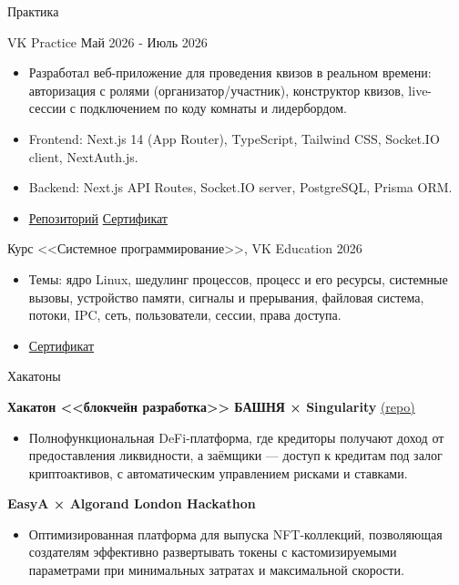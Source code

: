 \documentclass{style} %
\begin{document}
\begin{rSection}{Практика}

   
    VK Practice \hfill \hfill Май 2026 - Июль 2026\
    \begin{itemize}
        \itemsep -3pt {}
        \item Разработал веб-приложение для проведения квизов в реальном времени: авторизация с ролями (организатор/участник), конструктор квизов, live-сессии с подключением по коду комнаты и лидербордом.
        \item Frontend: Next.js 14 (App Router), TypeScript, Tailwind CSS, Socket.IO client, NextAuth.js.
        \item Backend: Next.js API Routes, Socket.IO server, PostgreSQL, Prisma ORM.
        \item \href{https://github.com/MaximovIlya/vk_practice_project}{Репозиторий} \quad \href{https://drive.google.com/file/d/1UOm4LQo9R1axcW96MlJNprpl17DQTAPg/view?usp=sharing}{Сертификат}
    \end{itemize}

    Курс <<Системное программирование>>, VK Education \hfill 2026\\
    \begin{itemize}
        \itemsep -3pt {}
        \item Темы: ядро Linux, шедулинг процессов, процесс и его ресурсы, системные вызовы, устройство памяти, сигналы и прерывания, файловая система, потоки, IPC, сеть, пользователи, сессии, права доступа.
        \item \href{СЕРТИФИКАТ_ССЫЛКА}{Сертификат}
    \end{itemize}

\end{rSection}

\begin{rSection}{Хакатоны}
\vspace{-1.25em}
\item \textbf{Хакатон <<блокчейн разработка>> БАШНЯ × Singularity} {\href{https://github.com/MaximovIlya/singularity}{(repo)}}
\begin{itemize}
    \itemsep -3pt {}
     \item Полнофункциональная DeFi-платформа, где кредиторы получают доход от предоставления ликвидности, а заёмщики — доступ к кредитам под залог криптоактивов, с автоматическим управлением рисками и ставками.
\end{itemize}

\item \textbf{EasyA × Algorand London Hackathon}
\begin{itemize}
    \itemsep -3pt {}
     \item Оптимизированная платформа для выпуска NFT-коллекций, позволяющая создателям эффективно развертывать токены с кастомизируемыми параметрами при минимальных затратах и максимальной скорости.
\end{itemize}

\end{rSection}
\end{document}
